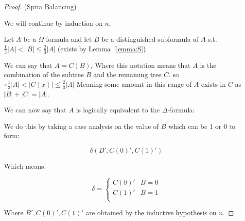 \documentclass{article}
\begin{document}
\begin{proof}(Spira Balancing)

  We will continue by induction on $n$.

  Let $A$ be a \(\Omega\)-formula and let $B$ be a distinguished subformula of $A$ s.t. $\frac{1}{3}|A| < |B| \leq \frac{2}{3}|A|$ (exists by Lemma~\ref{lemma:S})

  We can say that $A = C(B)$, Where this notation means that $A$ is the combination of the subtree $B$ and the remaining tree $C$.  so $\therefore \frac{1}{3}|A| < |C(x)| \leq \frac{2}{3}|A|$ Meaning some amount in this range of $A$ exists in $C$ as $|B| + |C| = |A|$.

  We can now say that $A$ is logically equivalent to the $\Delta$-formula:

  We do this by taking a case analysis on the value of $B$ which can be 1 or 0 to form:

  \[
    \delta(B', C(0)', C(1)')
  \]

  Which means:

  \[
    \delta =
  \begin{cases}
    C(0)' & B = 0 \\
    C(1)' & B = 1 \\
  \end{cases}
\]


  Where $B', C(0)', C(1)'$ are obtained by the inductive hypothesis on $n$.

\end{proof}
\end{document}

